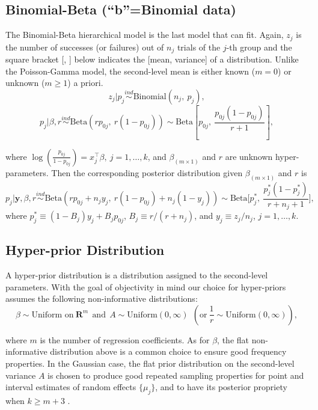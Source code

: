 \documentclass[article]{jss}
\begin{document}
\subsection[Binomial-Beta]{Binomial-Beta (``b''=Binomial data)}
The Binomial-Beta hierarchical model is the last model that  can fit. Again, $z_{j}$ is the number of successes (or failures) out of $n_{j}$ trials of the $j$-th group and the square bracket [, ] below indicates the [mean, variance] of a distribution. Unlike the Poisson-Gamma model, the second-level mean is either known ($m=0$) or unknown ($m\ge1$) a priori.
\begin{equation}
z_{j} \vert p_{j}\stackrel{ind}{\sim}\textrm{Binomial}(n_{j}, ~p_{j}),
\end{equation}
\begin{equation}
p_{j} \vert \beta, r\stackrel{ind}{\sim}\textrm{Beta}(rp_{0j},~ r(1-p_{0j}))\sim \textrm{Beta} \left[p_{0j}, ~\frac{p_{0j}(1-p_{0j})}{r + 1} \right],
\end{equation}

where $\log(\frac{p_{0j}}{1-p_{0j}}) =x_{j}^\top\beta, ~j=1, \ldots, k$, and $\beta_{(m\times1)}$ and $r$ are unknown hyper-parameters. Then the corresponding posterior distribution given  $\beta_{(m\times1)}$ and $r$ is
\begin{equation} \label{betapost}
p_{j}\vert \textbf{y}, \beta, r \stackrel{ind}{\sim}\textrm{Beta}(rp_{0j}+n_{j}y_{j},~r(1-p_{0j})+n_{j}(1-y_{j}))\sim\textrm{Beta}\bigg[p^{\ast}_{j},~ \frac{p^{\ast}_{j}(1-p^{\ast}_{j})}{r+n_{j}+1}\bigg],
\end{equation}
where $p^{\ast}_{j}\equiv(1-B_{j})y_{j}+B_{j}p_{0j}$, $B_{j}\equiv r/ (r+n_{j})$, and $y_{j}\equiv z_{j} / n_{j}$, $j=1,\ldots,k$.


\subsection[Hyper-prior distribution]{Hyper-prior Distribution}
A hyper-prior distribution is a distribution assigned to the second-level parameters. With the goal of objectivity in mind our choice for hyper-priors assumes the following non-informative distributions:
\begin{equation}
  \label{eq:hyper}
\beta \sim \textrm{Uniform on}~ \mathbf{R}^{m}~~\textrm{and}~~A \sim \textrm{Uniform}(0, \infty) ~~(\textrm{or} ~\frac{1}{r}\sim \textrm{Uniform}(0, \infty)),
\end{equation}

where $m$ is the number of regression coefficients. As for $\beta$, the flat non-informative distribution above is a common choice to ensure good frequency properties. In the Gaussian case, the flat prior distribution on the second-level variance $A$ is chosen to produce good repeated sampling properties for point and interval estimates of random effects $\{\mu_{j}\}$, and to have its posterior propriety when $k\ge m+3$ \citep{2011}. 
\end{document}
